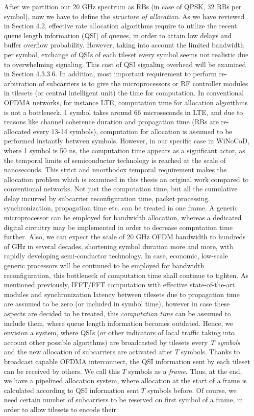 After we partition our 20 GHz spectrum as RBs (in case of QPSK, 32 RBs per symbol), now we have to define the \textit{structure of allocation}. As we have reviewed in Section 4.2, effective rate allocation algorithms require to utilize the recent queue length information (QSI) of queues, in order to attain low delays and buffer overflow probability. However, taking into account the limited bandwidth per symbol, exchange of QSIs of each tileset every symbol seems not realistic due to overwhelming signaling. This cost of QSI signaling overhead will be examined in Section 4.3.3.6. In addition, most important requirement to perform re-arbitration of subcarriers is to give the microprocessors or RF controller modules in tilesets (or central intelligent unit) the time for computation. In conventional OFDMA networks, for instance LTE, computation time for allocation algorithms is not a bottleneck. 1 symbol takes around 66 microseconds in LTE, and due to reasons like channel coherence duration and propagation time (RBs are re-allocated every 13-14 symbols), computation for allocation is assumed to be performed instantly between symbols. However, in our specific case in WiNoCoD, where 1 symbol is 50 ns, the computation time appears as a significant actor, as the temporal limits of semiconductor technology is reached at the scale of nanoseconds. This strict and unorthodox temporal requirement makes the allocation problem which is examined in this thesis an original work compared to conventional networks. Not just the computation time, but all the cumulative delay incurred by subcarrier reconfiguration time, packet processing, synchronization, propagation time etc. can be treated in one frame. A generic microprocessor can be employed for bandwidth allocation, whereas a dedicated digital circuitry may be implemented in order to decrease computation time further. Also, we can expect the scale of 20 GHz OFDM bandwidth to hundreds of GHz in several decades, shortening symbol duration more and more, with rapidly developing semi-conductor technology. In case, economic, low-scale generic processors will be continued to be employed for bandwidth reconfiguration, this bottleneck of computation time shall continue to tighten. As mentioned previously, IFFT/FFT computation with effective state-of-the-art modules and synchronization latency between tilesets due to propagation time are assumed to be zero (or included in symbol time), however in case these aspects are decided to be treated, this \textit{computation time} can be assumed to include them, where queue length information becomes outdated. Hence, we envision a system, where QSIs (or other indicators of local traffic taking into account other possible algorithms) are broadcasted by tilesets every \textit{T symbols} and the new allocation of subcarriers are activated after $T$ symbols. Thanks to broadcast capable OFDMA interconnect, the QSI information sent by each tileset can be received by others. We call this $T$ symbols as a \textit{frame}. Thus, at the end, we have a pipelined allocation system, where allocation at the start of a frame is calculated according to QSI information sent $T$ symbols before. Of course, we need certain number of subcarriers to be reserved on first symbol of a frame, in order to allow tilesets to encode their 